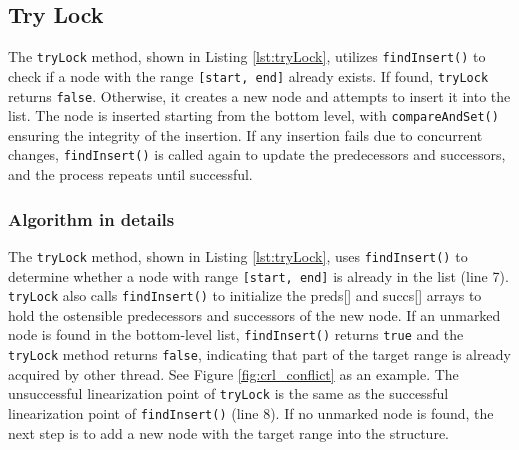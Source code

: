 \subsection{Try Lock}\label{subsec:tryLock}

The \texttt{tryLock} method, shown in Listing \ref{lst:tryLock}, utilizes \texttt{findInsert()} to check if a node with the range \texttt{[start, end]} already exists. If found, \texttt{tryLock} returns \texttt{false}. 
Otherwise, it creates a new node and attempts to insert it into the list. 
The node is inserted starting from the bottom level, with \texttt{compareAndSet()} ensuring the integrity of the insertion. 
If any insertion fails due to concurrent changes, \texttt{findInsert()} is called again to update the predecessors and successors, and the process repeats until successful.

\vspace{15pt}
\begin{figure}[h]
    \centering
    
\end{figure}

\subsubsection*{Algorithm in details}
The \texttt{tryLock} method, shown in Listing \ref{lst:tryLock}, uses \texttt{findInsert()} to determine whether a node with range \texttt{[start, end]} is already in the list (line 7). 
\texttt{tryLock} also calls \texttt{findInsert()} to initialize the preds[] and succs[] arrays to hold the ostensible predecessors and successors of the new node.
If an unmarked node is found in the bottom-level list, \texttt{findInsert()} returns \texttt{true} and the \texttt{tryLock} method returns \texttt{false}, indicating that part of the target range is already acquired by other thread.
See Figure \ref{fig:crl_conflict} as an example.
The unsuccessful linearization point of \texttt{tryLock} is the same as the successful linearization point of \texttt{findInsert()} (line 8). 
If no unmarked node is found, the next step is to add a new node with the target range into the structure.

